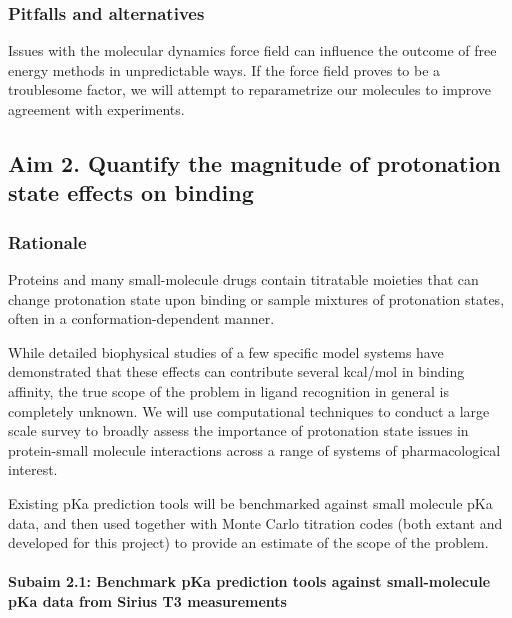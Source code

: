 \documentclass[10pt,final]{article}
\newcommand{\subsubsubsection}[1]{\paragraph*{#1}}
\begin{document}
\subsubsection*{Pitfalls and alternatives}

Issues with the molecular dynamics force field can influence the outcome of free energy methods in unpredictable ways. If the force field proves to be a troublesome factor, we will attempt to reparametrize our molecules to improve agreement with experiments.

\subsection*{Aim 2. Quantify the magnitude of protonation state effects on binding}
\subsubsection*{Rationale}
Proteins and many small-molecule drugs contain titratable moieties that can change protonation state upon binding or sample mixtures of protonation states, often in a conformation-dependent manner.
\begin{center}
\end{center}
While detailed biophysical studies of a few specific model systems have demonstrated that these effects can contribute several kcal/mol in binding affinity, the true scope of the problem in ligand recognition in general is completely unknown.
We will use computational techniques to conduct a large scale survey to broadly assess the importance of protonation state issues in protein-small molecule interactions across a range of systems of pharmacological interest.

Existing pKa prediction tools will be benchmarked against small molecule pKa data, and then used together with Monte Carlo titration codes (both extant and developed for this project) to provide an estimate of the scope of the problem.

\subsubsubsection{Subaim 2.1: Benchmark pKa prediction tools against small-molecule pKa data from Sirius T3 measurements}
\end{document}
